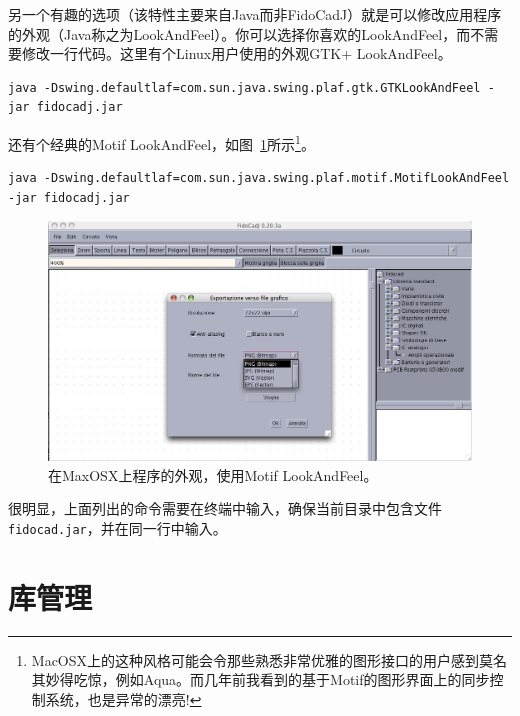 \documentclass[10pt,a4paper,twoside]{scrreprt}
\begin{document}
另一个有趣的选项（该特性主要来自Java而非FidoCadJ）就是可以修改应用程序的外观（Java称之为LookAndFeel）。你可以选择你喜欢的LookAndFeel，而不需要修改一行代码。这里有个Linux用户使用的外观GTK+ LookAndFeel。
\begin{lstlisting} 
java -Dswing.defaultlaf=com.sun.java.swing.plaf.gtk.GTKLookAndFeel -jar fidocadj.jar 
\end{lstlisting} 
还有个经典的Motif LookAndFeel，如图~\ref{fig_fidocadj_motif}所示\footnote{MacOSX上的这种风格可能会令那些熟悉非常优雅的图形接口的用户感到莫名其妙得吃惊，例如Aqua。而几年前我看到的基于Motif的图形界面上的同步控制系统，也是异常的漂亮!}。
\begin{lstlisting}
java -Dswing.defaultlaf=com.sun.java.swing.plaf.motif.MotifLookAndFeel -jar fidocadj.jar 
\end{lstlisting} %
\begin{figure}
\includegraphics[width=1\textwidth]{fidocadj_motif} 

\caption{在MaxOSX上程序的外观，使用Motif LookAndFeel。}

\label{fig_fidocadj_motif} 
\end{figure}


很明显，上面列出的命令需要在终端中输入，确保当前目录中包含文件\lstinline!fidocad.jar!，并在同一行中输入。

\lstset{language=FIDOCAD,
 basicstyle=\small\ttfamily}

\section{库管理}
\end{document}
